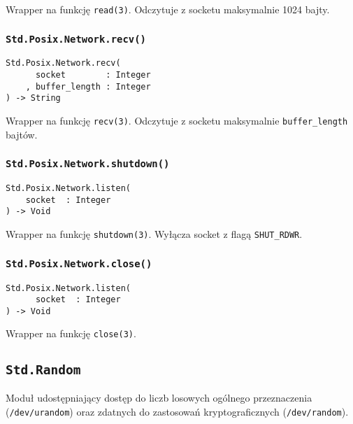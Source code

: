 Wrapper na funkcję \texttt{read(3)}. Odczytuje z socketu maksymalnie 1024 bajty.

\subsubsection{\texttt{Std.Posix.Network.recv()}}

\begin{small}
\begin{lstlisting}
Std.Posix.Network.recv(
      socket        : Integer
    , buffer_length : Integer
) -> String
\end{lstlisting}
\end{small}

Wrapper na funkcję \texttt{recv(3)}. Odczytuje z socketu maksymalnie \texttt{buffer\_length} bajtów.

\subsubsection{\texttt{Std.Posix.Network.shutdown()}}

\begin{small}
\begin{lstlisting}
Std.Posix.Network.listen(
    socket  : Integer
) -> Void
\end{lstlisting}
\end{small}

Wrapper na funkcję \texttt{shutdown(3)}.
Wyłącza socket z flagą \texttt{SHUT\_RDWR}.

\subsubsection{\texttt{Std.Posix.Network.close()}}

\begin{small}
\begin{lstlisting}
Std.Posix.Network.listen(
      socket  : Integer
) -> Void
\end{lstlisting}
\end{small}

Wrapper na funkcję \texttt{close(3)}.


\subsection{\texttt{Std.Random}}
\label{stdlib_Std_Random}

Moduł udostępniający dostęp do liczb losowych ogólnego przeznaczenia (\texttt{/dev/urandom}) oraz zdatnych do
zastosowań kryptograficznych (\texttt{/dev/random}).

